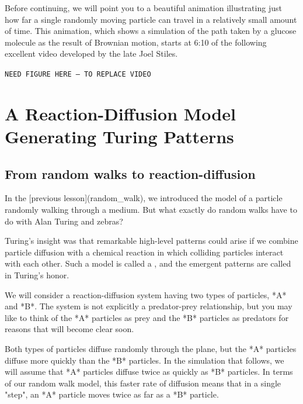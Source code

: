 Before continuing, we will point you to a beautiful animation illustrating just how far a single randomly moving particle can travel in a relatively small amount of time. This animation, which shows a simulation of the path taken by a glucose molecule as the result of Brownian motion, starts at 6:10 of the following excellent video developed by the late Joel Stiles.

\texttt{NEED FIGURE HERE -- TO REPLACE VIDEO}\\

















\FloatBarrier
{}

\section{A Reaction-Diffusion Model Generating Turing Patterns}
\label{sec:a_reaction-diffusion_model_generating_turing_patterns}

\subsection{From random walks to reaction-diffusion}

In the [previous lesson](random_walk), we introduced the model of a particle randomly walking through a medium. But what exactly do random walks have to do with Alan Turing and zebras?

Turing's insight was that remarkable high-level patterns could arise if we combine particle diffusion with a chemical reaction in which colliding particles interact with each other. Such a model is called a , and the emergent patterns are called  in Turing's honor.

We will consider a reaction-diffusion system having two types of particles, *A* and *B*. The system is not explicitly a predator-prey relationship, but you may like to think of the *A* particles as prey and the *B* particles as predators for reasons that will become clear soon.

Both types of particles diffuse randomly through the plane, but the *A* particles diffuse more quickly than the *B* particles.  In the simulation that follows, we will assume that *A* particles diffuse twice as quickly as *B* particles. In terms of our random walk model, this faster rate of diffusion means that in a single "step", an *A* particle moves twice as far as a *B* particle.

